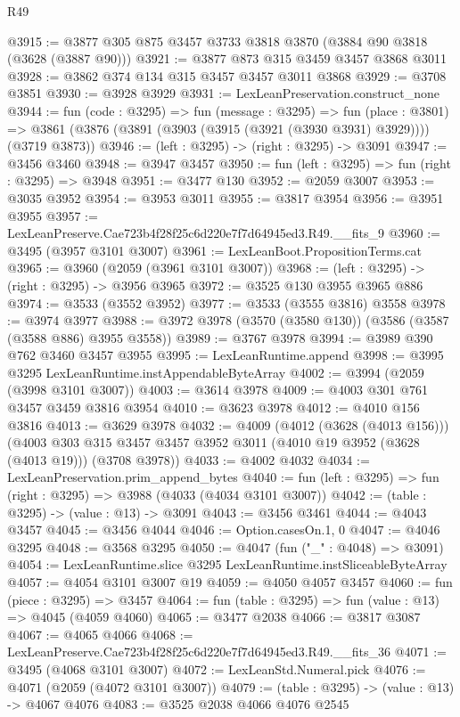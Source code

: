 \begin{lexlean}{R49}
\begin{coremodule}
@3915 := @3877 @305 @875 @3457 @3733 @3818 @3870 (@3884 @90 @3818 (@3628 (@3887 @90)))
@3921 := @3877 @873 @315 @3459 @3457 @3868 @3011
@3928 := @3862 @374 @134 @315 @3457 @3457 @3011 @3868
@3929 := @3708 @3851
@3930 := @3928 @3929
@3931 := LexLeanPreservation.construct_none
@3944 := fun (code : @3295) =>
  fun (message : @3295) =>
  fun (place : @3801) =>
  @3861 (@3876 (@3891 (@3903 (@3915 (@3921 (@3930 @3931) @3929)))) (@3719 @3873))
@3946 := (left : @3295) -> (right : @3295) -> @3091
@3947 := @3456 @3460
@3948 := @3947 @3457
@3950 := fun (left : @3295) => fun (right : @3295) => @3948
@3951 := @3477 @130
@3952 := @2059 @3007
@3953 := @3035 @3952
@3954 := @3953 @3011
@3955 := @3817 @3954
@3956 := @3951 @3955
@3957 := LexLeanPreserve.Cae723b4f28f25c6d220e7f7d64945ed3.R49.__fits_9
@3960 := @3495 (@3957 @3101 @3007)
@3961 := LexLeanBoot.PropositionTerms.cat
@3965 := @3960 (@2059 (@3961 @3101 @3007))
@3968 := (left : @3295) -> (right : @3295) -> @3956 @3965
@3972 := @3525 @130 @3955 @3965 @886
@3974 := @3533 (@3552 @3952)
@3977 := @3533 (@3555 @3816) @3558
@3978 := @3974 @3977
@3988 := @3972 @3978 (@3570 (@3580 @130)) (@3586 (@3587 (@3588 @886) @3955 @3558))
@3989 := @3767 @3978
@3994 := @3989 @390 @762 @3460 @3457 @3955
@3995 := LexLeanRuntime.append
@3998 := @3995 @3295 LexLeanRuntime.instAppendableByteArray
@4002 := @3994 (@2059 (@3998 @3101 @3007))
@4003 := @3614 @3978
@4009 := @4003 @301 @761 @3457 @3459 @3816 @3954
@4010 := @3623 @3978
@4012 := @4010 @156 @3816
@4013 := @3629 @3978
@4032 := @4009
    (@4012 (@3628 (@4013 @156)))
    (@4003 @303 @315 @3457 @3457 @3952 @3011 (@4010 @19 @3952 (@3628 (@4013 @19))) (@3708 @3978))
@4033 := @4002 @4032
@4034 := LexLeanPreservation.prim_append_bytes
@4040 := fun (left : @3295) => fun (right : @3295) => @3988 (@4033 (@4034 @3101 @3007))
@4042 := (table : @3295) -> (value : @13) -> @3091
@4043 := @3456 @3461
@4044 := @4043 @3457
@4045 := @3456 @4044
@4046 := Option.casesOn.{1, 0}
@4047 := @4046 @3295
@4048 := @3568 @3295
@4050 := @4047 (fun ("_" : @4048) => @3091)
@4054 := LexLeanRuntime.slice @3295 LexLeanRuntime.instSliceableByteArray
@4057 := @4054 @3101 @3007 @19
@4059 := @4050 @4057 @3457
@4060 := fun (piece : @3295) => @3457
@4064 := fun (table : @3295) => fun (value : @13) => @4045 (@4059 @4060)
@4065 := @3477 @2038
@4066 := @3817 @3087
@4067 := @4065 @4066
@4068 := LexLeanPreserve.Cae723b4f28f25c6d220e7f7d64945ed3.R49.__fits_36
@4071 := @3495 (@4068 @3101 @3007)
@4072 := LexLeanStd.Numeral.pick
@4076 := @4071 (@2059 (@4072 @3101 @3007))
@4079 := (table : @3295) -> (value : @13) -> @4067 @4076
@4083 := @3525 @2038 @4066 @4076 @2545

\end{coremodule}
\end{lexlean}
